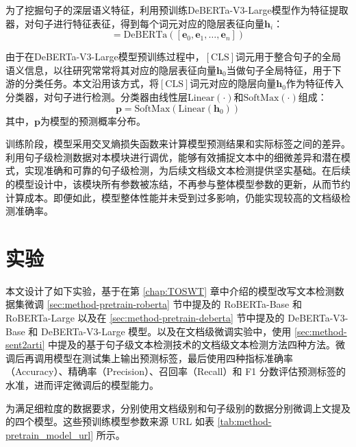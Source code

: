 为了挖掘句子的深层语义特征，利用预训练DeBERTa-V3-Large模型作为特征提取器，对句子进行特征表征，得到每个词元对应的隐层表征向量$\mathbf{h}_{i}$：
\begin{equation}
    [\mathbf{h}_{0}, \mathbf{h}_{1}, \ldots, \mathbf{h}_{n}]=\mathrm{DeBERTa}([\mathbf{e}_{0}, \mathbf{e}_{1}, \ldots, \mathbf{e}_{n}])
\end{equation}

由于在DeBERTa-V3-Large模型预训练过程中，$[\mathrm{CLS}]$词元用于整合句子的全局语义信息，以往研究常常将其对应的隐层表征向量$\mathbf{h}_{0}$当做句子全局特征，用于下游的分类任务。本文沿用该方式，将$[\mathrm{CLS}]$词元对应的隐层向量$\mathbf{h}_{0}$作为特征传入分类器，对句子进行检测。分类器由线性层$\mathrm{Linear}(\cdot)$和$\mathrm{SoftMax}(\cdot)$组成：
\begin{equation}
    \mathbf{p}=\mathrm{SoftMax}(\mathrm{Linear}(\mathbf{h}_{0}))
\end{equation}
其中，$\mathbf{p}$为模型的预测概率分布。

训练阶段，模型采用交叉熵损失函数来计算模型预测结果和实际标签之间的差异。利用句子级检测数据对本模块进行调优，能够有效捕捉文本中的细微差异和潜在模式，实现准确和可靠的句子级检测，为后续文档级文本检测提供坚实基础。在后续的模型设计中，该模块所有参数被冻结，不再参与整体模型参数的更新，从而节约计算成本。即便如此，模型整体性能并未受到过多影响，仍能实现较高的文档级检测准确率。

\section{实验}
\label{sec:method-experiment}

本文设计了如下实验，基于在第 \ref{chap:TOSWT} 章中介绍的模型改写文本检测数据集微调 \ref{sec:method-pretrain-roberta} 节中提及的 RoBERTa-Base 和 RoBERTa-Large 以及在 \ref{sec:method-pretrain-deberta} 节中提及的 DeBERTa-V3-Base 和 DeBERTa-V3-Large 模型。以及在文档级微调实验中，使用 \ref{sec:method-sent2arti} 中提及的基于句子级文本检测技术的文档级文本检测方法四种方法。微调后再调用模型在测试集上输出预测标签，最后使用四种指标准确率（Accuracy）、精确率（Precision）、召回率（Recall）和 F1 分数评估预测标签的水准，进而评定微调后的模型能力。

为满足细粒度的数据要求，分别使用文档级别和句子级别的数据分别微调上文提及的四个模型。这些预训练模型参数来源 URL 如表 \ref{tab:method-pretrain_model_url} 所示。

